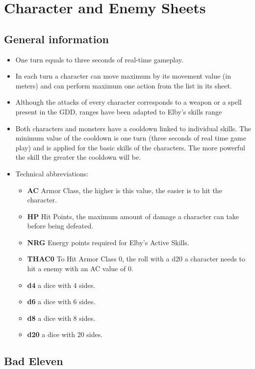 \section{Character and Enemy Sheets}

\subsection{General information}
\begin{itemize}
	\item One turn equals to three seconds of real-time gameplay.
	\item In each turn a character can move maximum by its movement value (in meters) and can perform maximum one action from the list in its sheet.
	\item Although the attacks of every character corresponds to a weapon or a spell present in the GDD, ranges have been adapted to Elby's skills range
	\item Both characters and monsters have a cooldown linked to individual skills. The minimum value of the cooldown is one turn (three seconds of real time game play) and is applied for the basic skills of the characters. The more powerful the skill the greater the cooldown will be.
	\item Technical abbreviations:
	\begin{itemize}
		\item \textbf{AC} Armor Class, the higher is this value, the easier is to hit the character.
		\item \textbf{HP} Hit Points, the maximum amount of damage a character can take before being defeated.
		\item \textbf{NRG} Energy points required for Elby's Active Skills.
		\item \textbf{THAC0} To Hit Armor Class 0, the roll with a d20 a character needs to hit a enemy with an AC value of 0.
		\item \textbf{d4} a dice with 4 sides.
		\item \textbf{d6} a dice with 6 sides.
		\item \textbf{d8} a dice with 8 sides.
		\item \textbf{d20} a dice with 20 sides.
	\end{itemize}
\end{itemize}

\newpage

\subsection{Bad Eleven}


